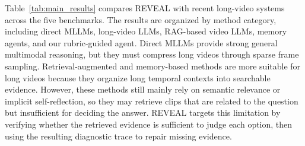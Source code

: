 \documentclass[letterpaper]{article} %
\begin{document}
Table~\ref{tab:main_results} compares REVEAL with recent long-video systems across the five benchmarks. The results are organized by method category, including direct MLLMs, long-video LLMs, RAG-based video LLMs, memory agents, and our rubric-guided agent. Direct MLLMs provide strong general multimodal reasoning, but they must compress long videos through sparse frame sampling. Retrieval-augmented and memory-based methods are more suitable for long videos because they organize long temporal contexts into searchable evidence. However, these methods still mainly rely on semantic relevance or implicit self-reflection, so they may retrieve clips that are related to the question but insufficient for deciding the answer. REVEAL targets this limitation by verifying whether the retrieved evidence is sufficient to judge each option, then using the resulting diagnostic trace to repair missing evidence.


\begin{table}[t]
\centering
\scriptsize
\setlength{\tabcolsep}{2.5pt}
\renewcommand{\arraystretch}{1.05}
\caption{Ablation results on Video-MME-L and LVBench.
$\mathcal{M}_{\mathrm{base}}$ uses single-round retrieval over local
segment memory. $\mathcal{M}_{\mathrm{iter}}$ adds iterative retrieval.
The rubric and hybrid variants further introduce rubric-based
sufficiency verification and hybrid memory, respectively. Ours combines
all three components.}
\label{tab:ablation_design}
\end{table}
\end{document}
